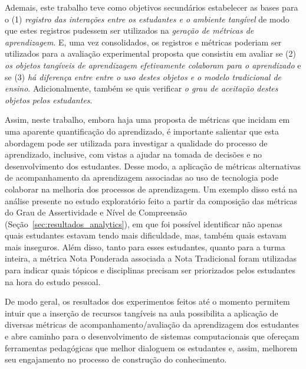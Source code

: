 Ademais, este trabalho teve como objetivos secundários estabelecer as bases para o (1) \textit{registro das interações entre os estudantes e o ambiente tangível} de modo que estes registros pudessem ser utilizados na \textit{geração de métricas de aprendizagem}. E, uma vez consolidados, os registros e métricas poderiam ser utilizados para a avaliação experimental proposta que consistiu em avaliar se (2) \textit{os objetos tangíveis de aprendizagem efetivamente colaboram para o aprendizado} e se (3) \textit{há diferença entre entre o uso destes objetos e o modelo tradicional de ensino}. Adicionalmente, também se quis verificar \textit{o grau de aceitação destes objetos pelos estudantes}.

Assim, neste trabalho, embora haja uma proposta de métricas que incidam em uma aparente quantificação do aprendizado, é importante salientar que esta abordagem pode ser utilizada para investigar a qualidade do processo de aprendizado, inclusive, com vistas a ajudar na tomada de decisões e no desenvolvimento dos estudantes. Desse modo, a aplicação de métricas alternativas de acompanhamento da aprendizagem associadas ao uso de tecnologia pode colaborar na melhoria dos processos de aprendizagem. Um exemplo disso está na análise presente no estudo exploratório feito a partir da composição das métricas do Grau de Assertividade e Nível de Compreensão (Seção~\ref{sec:resultados_analytics}), em que foi possível identificar não apenas quais estudantes estavam tendo mais dificuldade, mas, também quais estavam mais inseguros. Além disso, tanto para esses estudantes, quanto para a turma inteira, a métrica Nota Ponderada associada a Nota Tradicional foram utilizadas para indicar quais tópicos e disciplinas precisam ser priorizados pelos estudantes na hora do estudo pessoal.


De modo geral, os resultados dos experimentos feitos até o momento permitem intuir que a inserção de recursos tangíveis na aula possibilita a aplicação de diversas métricas de acompanhamento/avaliação da aprendizagem dos estudantes e abre caminho para o desenvolvimento de sistemas computacionais %
que ofereçam %
ferramentas pedagógicas que melhor dialoguem os estudantes e, assim, melhorem seu engajamento no processo de construção do conhecimento.

